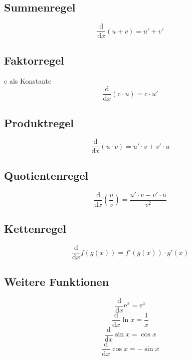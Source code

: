 \documentclass{article}
\begin{document}
 
 
\newcommand{\derive}{\frac{\mathrm{d}}{\mathrm{d}x}} 
 
\subsection*{Summenregel} 
\[ \derive (u + v) = u' + v' \]
  
\subsection*{Faktorregel}
$\mathrm{c}$ als Konstante 
\[ \derive (\mathrm{c} \cdot u) = \mathrm{c} \cdot u' \]
 
\subsection*{Produktregel} 
\[ \derive (u \cdot v) = u' \cdot v + v' \cdot u \] 
 
\subsection*{Quotientenregel} 
\[ \derive \left( \frac{u}{v} \right) = \frac{u' \cdot v - v' \cdot u}{v^2} \] 
 
\subsection*{Kettenregel}
\[ \derive f(g(x)) = f'(g(x)) \cdot g'(x) \]
 
\subsection*{Weitere Funktionen}
\[ \derive \mathrm{e}^x = \mathrm{e}^x \]
\[ \derive \ln x = \frac{1}{x} \]
\[ \derive \sin x = \cos x \] 
\[ \derive \cos x = -\sin x \] 
\end{document}
